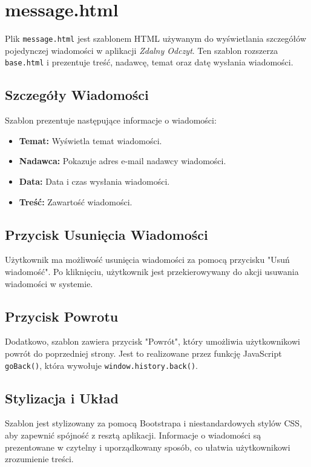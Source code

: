 \documentclass[12pt,a4paper]{report}
\begin{document}
\section{message.html}
\label{sec:login}
Plik \texttt{message.html} jest szablonem HTML używanym do wyświetlania szczegółów pojedynczej wiadomości w aplikacji \textit{Zdalny Odczyt}. Ten szablon rozszerza \texttt{base.html} i prezentuje treść, nadawcę, temat oraz datę wysłania wiadomości.

\subsection{Szczegóły Wiadomości}
Szablon prezentuje następujące informacje o wiadomości:
\begin{itemize}
\item \textbf{Temat:} Wyświetla temat wiadomości.
\item \textbf{Nadawca:} Pokazuje adres e-mail nadawcy wiadomości.
\item \textbf{Data:} Data i czas wysłania wiadomości.
\item \textbf{Treść:} Zawartość wiadomości.
\end{itemize}

\subsection{Przycisk Usunięcia Wiadomości}
Użytkownik ma możliwość usunięcia wiadomości za pomocą przycisku "Usuń wiadomość". Po kliknięciu, użytkownik jest przekierowywany do akcji usuwania wiadomości w systemie.

\subsection{Przycisk Powrotu}
Dodatkowo, szablon zawiera przycisk "Powrót", który umożliwia użytkownikowi powrót do poprzedniej strony. Jest to realizowane przez funkcję JavaScript \texttt{goBack()}, która wywołuje \texttt{window.history.back()}.

\subsection{Stylizacja i Układ}
Szablon jest stylizowany za pomocą Bootstrapa i niestandardowych stylów CSS, aby zapewnić spójność z resztą aplikacji. Informacje o wiadomości są prezentowane w czytelny i uporządkowany sposób, co ułatwia użytkownikowi zrozumienie treści.
\end{document}
